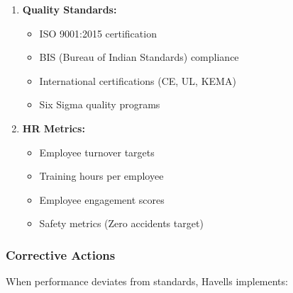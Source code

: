 \documentclass[12pt,a4paper]{article}
\begin{document}
\begin{enumerate}[leftmargin=*]
    \item \textbf{Quality Standards:}
    \begin{itemize}
        \item ISO 9001:2015 certification
        \item BIS (Bureau of Indian Standards) compliance
        \item International certifications (CE, UL, KEMA)
        \item Six Sigma quality programs
    \end{itemize}
    
    \item \textbf{HR Metrics:}
    \begin{itemize}
        \item Employee turnover targets
        \item Training hours per employee
        \item Employee engagement scores
        \item Safety metrics (Zero accidents target)
    \end{itemize}
\end{enumerate}

\subsubsection{Corrective Actions}

When performance deviates from standards, Havells implements:
\end{document}
